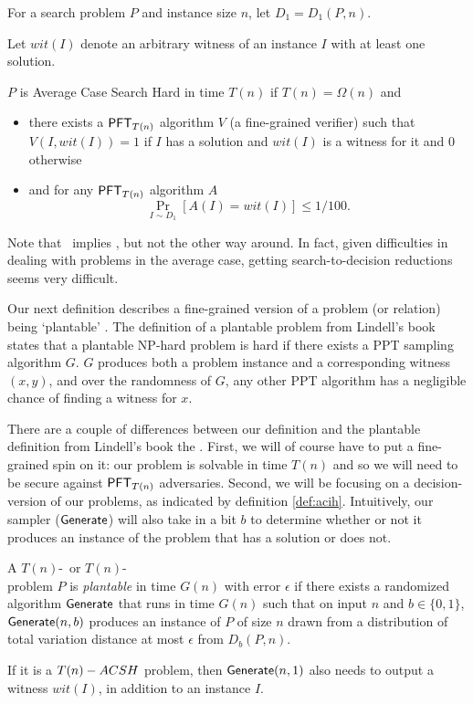 \begin{definition}
	\label{def:acsh}
	For a search problem $P$ and instance size $n$, let $D_1 = D_{1}(P,n)$.
	
	Let $wit(I)$ denote an arbitrary witness of an instance $I$ with at least one solution.
	
	$P$ is Average Case Search Hard in time $T(n)$ if $T(n)=\Omega(n)$ and
	\begin{itemize}
		\item there exists a $\mathsf{PFT}_{T(n)}$ algorithm $V$ (a fine-grained verifier) such that $V(I, wit(I)) = 1$ if $I$ has a solution and $wit(I)$ is a witness for it and $0$ otherwise
		\item and for any  $\mathsf{PFT}_{ T(n)}$ algorithm $A$
		\[ \Pr_{I \sim D_1}[A(I) = wit(I)] \le 1/100. \]
	\end{itemize}
\end{definition}

Note that \ACIH~implies \ACSH, but not the other way around. In fact, given difficulties in dealing with problems in the average case, getting search-to-decision reductions seems very difficult.

Our next definition describes a fine-grained version of a problem (or relation) being `plantable' \cite{Lindell}. The definition of a plantable problem from Lindell's book states that a plantable NP-hard problem is hard if there exists a PPT sampling algorithm $G$. $G$ produces both a problem instance and a corresponding witness $(x,y)$, and over the randomness of $G$, any other PPT algorithm has a negligible chance of finding a witness for $x$.

There are a couple of differences between our definition and the plantable definition from Lindell's book the  \cite{Lindell}. First, we will of course have to put a fine-grained spin on it: our problem is solvable in time $T(n)$ and so we will need to be secure against $\mathsf{PFT}_{T(n)}$ adversaries. Second, we will be focusing on a decision-version of our problems, as indicated by definition \ref{def:acih}. Intuitively, our sampler ($\mathsf{Generate}$) will also take in a bit $b$ to determine whether or not it produces an instance of the problem that has a solution or does not.

\begin{definition}
	\label{def:plantable}
	A $T(n)$-\ACIH~or $T(n)$-\ACSH~\\problem $P$ is \emph{plantable} in time $G(n)$ with error $\epsilon$ if there exists a randomized algorithm $\mathsf{Generate}$ that runs in time $G(n)$ such that on input $n$ and $b \in \{0,1\}$, $\mathsf{Generate}(n,b)$ produces an instance of $P$ of size $n$ drawn from a distribution of total variation distance at most $\epsilon$ from $D_{b}(P, n)$.
	
	If it is a $T(n)-ACSH$ problem, then $\mathsf{Generate}(n, 1)$ also needs to output a witness $wit(I)$, in addition to an instance $I$.
\end{definition}

